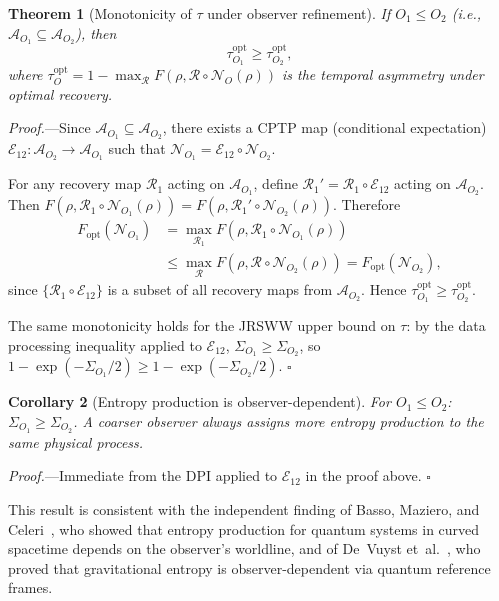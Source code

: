 \documentclass[prl,twocolumn,superscriptaddress,longbibliography,floatfix]{revtex4-2}
\newtheorem{theorem}{Theorem}
\newtheorem{corollary}[theorem]{Corollary}
\newcommand{\Petz}{\mathcal{R}}
\newcommand{\chan}{\mathcal{N}}
\newcommand{\tauasym}{\tau}
\newcommand{\algO}{\mathcal{A}}
\begin{document}
\begin{theorem}[Monotonicity of $\tauasym$ under observer
  refinement]
\label{thm:mono}
If\/ $O_1 \leq O_2$ (i.e., $\algO_{O_1} \subseteq \algO_{O_2}$),
then
\begin{equation}
\tauasym_{O_1}^{\mathrm{opt}} \geq \tauasym_{O_2}^{\mathrm{opt}},
\label{eq:mono}
\end{equation}
where $\tauasym_O^{\mathrm{opt}} = 1 - \max_{\Petz}
F(\rho, \Petz \circ \chan_O(\rho))$ is the temporal asymmetry
under optimal recovery.
\end{theorem}

\emph{Proof.}---Since $\algO_{O_1} \subseteq \algO_{O_2}$,
there exists a CPTP map (conditional expectation)
$\mathcal{E}_{12}: \algO_{O_2} \to \algO_{O_1}$ such that
$\chan_{O_1} = \mathcal{E}_{12} \circ \chan_{O_2}$.

For any recovery map $\Petz_1$ acting on $\algO_{O_1}$, define
$\Petz_1' = \Petz_1 \circ \mathcal{E}_{12}$ acting on
$\algO_{O_2}$.  Then
$F(\rho, \Petz_1 \circ \chan_{O_1}(\rho))
= F(\rho, \Petz_1' \circ \chan_{O_2}(\rho))$.
Therefore
\begin{align}
F_{\mathrm{opt}}(\chan_{O_1})
&= \max_{\Petz_1} F(\rho, \Petz_1 \circ \chan_{O_1}(\rho))
\nonumber \\
&\leq \max_{\Petz} F(\rho, \Petz \circ \chan_{O_2}(\rho))
= F_{\mathrm{opt}}(\chan_{O_2}),
\label{eq:fopt_mono}
\end{align}
since $\{\Petz_1 \circ \mathcal{E}_{12}\}$ is a subset of all
recovery maps from $\algO_{O_2}$.  Hence
$\tauasym_{O_1}^{\mathrm{opt}} \geq
\tauasym_{O_2}^{\mathrm{opt}}$.

The same monotonicity holds for the JRSWW upper bound on
$\tauasym$: by the data processing inequality applied to
$\mathcal{E}_{12}$,
$\Sigma_{O_1} \geq \Sigma_{O_2}$, so
$1 - \exp(-\Sigma_{O_1}/2) \geq 1 - \exp(-\Sigma_{O_2}/2)$.
\hfill$\square$

\begin{corollary}[Entropy production is observer-dependent]
\label{cor:sigma}
For $O_1 \leq O_2$: $\Sigma_{O_1} \geq \Sigma_{O_2}$.
A coarser observer always assigns more entropy production to
the same physical process.
\end{corollary}

\emph{Proof.}---Immediate from the DPI applied to
$\mathcal{E}_{12}$ in the proof above. \hfill$\square$

This result is consistent with the independent finding of
Basso, Maziero, and Celeri~\cite{BassoCeleri2025}, who showed
that entropy production for quantum systems in curved spacetime
depends on the observer's worldline, and of
De~Vuyst et~al.~\cite{DeVuyst2025}, who proved that
gravitational entropy is observer-dependent via quantum
reference frames.
\end{document}
